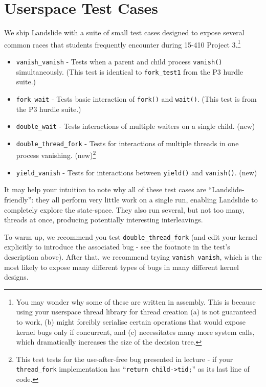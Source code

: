 \documentclass{article}
\begin{document}
\section{Userspace Test Cases}
\label{sec:testcase}

We ship Landslide with a suite of small test cases designed to expose several common races that students frequently encounter during 15-410 Project 3.\footnote{You may wonder why some of these are written in assembly.
This is because using your userspace thread library for thread creation (a) is not guaranteed to work, (b) might forcibly serialise certain operations that would expose kernel bugs only if concurrent, and (c) necessitates many more system calls, which dramatically increases the size of the decision tree.}

\begin{itemize}
	\item \texttt{vanish\_vanish} - Tests when a parent and child process \texttt{vanish()} simultaneously. (This test is identical to \texttt{fork\_test1} from the P3 hurdle suite.)
	\item \texttt{fork\_wait} - Tests basic interaction of \texttt{fork()} and \texttt{wait()}. (This test is from the P3 hurdle suite.)
	\item \texttt{double\_wait} - Tests interactions of multiple waiters on a single child. (new)
	\item \texttt{double\_thread\_fork} - Tests for interactions of multiple threads in one process vanishing. (new)\footnote{This test tests for the use-after-free bug presented in lecture - if your \texttt{thread\_fork} implementation has ``\texttt{return child->tid;}'' as its last line of code.}
	\item \texttt{yield\_vanish} - Tests for interactions between \texttt{yield()} and \texttt{vanish()}. (new)
\end{itemize}

It may help your intuition to note why all of these test cases are ``Landslide-friendly'': they all perform very little work on a single run, enabling Landslide to completely explore the state-space. They also run several, but not too many, threads at once, producing potentially interesting interleavings.

To warm up, we recommend you test \texttt{double\_thread\_fork} (and edit your kernel explicitly to introduce the associated bug - see the footnote in the test's description above).
After that, we recommend trying \texttt{vanish\_vanish}, which is the most likely to expose many different types of bugs in many different kernel designs.
\end{document}

